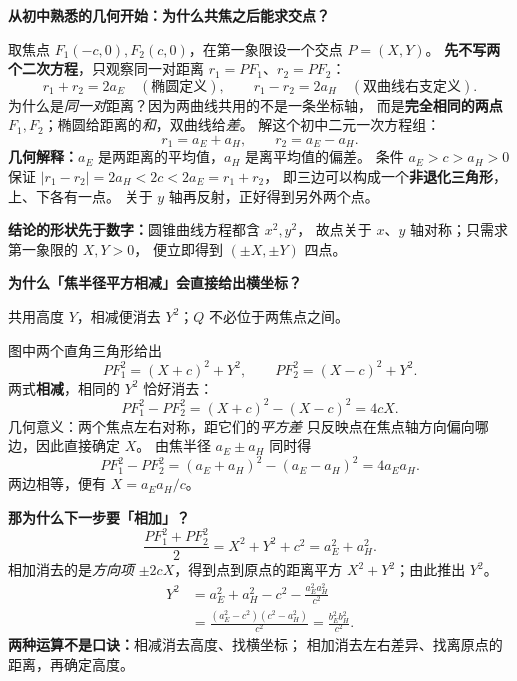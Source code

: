 \clearpage
\begin{explanationbox}
\textbf{从初中熟悉的几何开始：为什么共焦之后能求交点？}

取焦点 $F_1(-c,0),F_2(c,0)$，在第一象限设一个交点 $P=(X,Y)$。
\textbf{先不写两个二次方程}，只观察同一对距离
$r_1=PF_1$、$r_2=PF_2$：
\[
r_1+r_2=2a_E\quad(\text{椭圆定义}),\qquad
r_1-r_2=2a_H\quad(\text{双曲线右支定义}).
\]
为什么是\emph{同一对}距离？因为两曲线共用的不是一条坐标轴，
而是\textbf{完全相同的两点} $F_1,F_2$；椭圆给距离的\emph{和}，双曲线给\emph{差}。
解这个初中二元一次方程组：
\[
\boxed{r_1=a_E+a_H},\qquad\boxed{r_2=a_E-a_H}.
\]
\textbf{几何解释：}$a_E$ 是两距离的平均值，$a_H$ 是离平均值的偏差。
条件 $a_E>c>a_H>0$ 保证
$\lvert r_1-r_2\rvert=2a_H<2c<2a_E=r_1+r_2$，
即三边可以构成一个\textbf{非退化三角形}，上、下各有一点。
关于 $y$ 轴再反射，正好得到另外两个点。

\textbf{结论的形状先于数字：}圆锥曲线方程都含 $x^2,y^2$，
故点关于 $x$、$y$ 轴对称；只需求第一象限的 $X,Y>0$，
便立即得到 $(\pm X,\pm Y)$ 四点。
\end{explanationbox}

\clearpage
\begin{explanationbox}
\textbf{为什么「焦半径平方相减」会直接给出横坐标？}

\begin{center}


{\small 共用高度 $Y$，相减便消去 $Y^2$；$Q$ 不必位于两焦点之间。}
\end{center}
图中两个直角三角形给出
\[
PF_1^2=(X+c)^2+Y^2,\qquad PF_2^2=(X-c)^2+Y^2.
\]
两式\textbf{相减}，相同的 $Y^2$ 恰好消去：
\[
PF_1^2-PF_2^2=(X+c)^2-(X-c)^2=4cX.
\]
几何意义：两个焦点左右对称，距它们的\emph{平方差}
只反映点在焦点轴方向偏向哪边，因此直接确定 $X$。
由焦半径 $a_E\pm a_H$ 同时得
\[
PF_1^2-PF_2^2=(a_E+a_H)^2-(a_E-a_H)^2=4a_Ea_H.
\]
两边相等，便有 $X=a_Ea_H/c$。

\textbf{那为什么下一步要「相加」？}
\[
\frac{PF_1^2+PF_2^2}{2}=X^2+Y^2+c^2=a_E^2+a_H^2.
\]
相加消去的是\emph{方向项} $\pm2cX$，得到点到原点的距离平方
$X^2+Y^2$；由此推出 $Y^2$。
\[
\begin{aligned}
Y^2&=a_E^2+a_H^2-c^2-\frac{a_E^2a_H^2}{c^2}\\
&=\frac{(a_E^2-c^2)(c^2-a_H^2)}{c^2}
=\frac{b_E^2b_H^2}{c^2}.
\end{aligned}
\]
\textbf{两种运算不是口诀：}相减消去高度、找横坐标；
相加消去左右差异、找离原点的距离，再确定高度。
\end{explanationbox}

